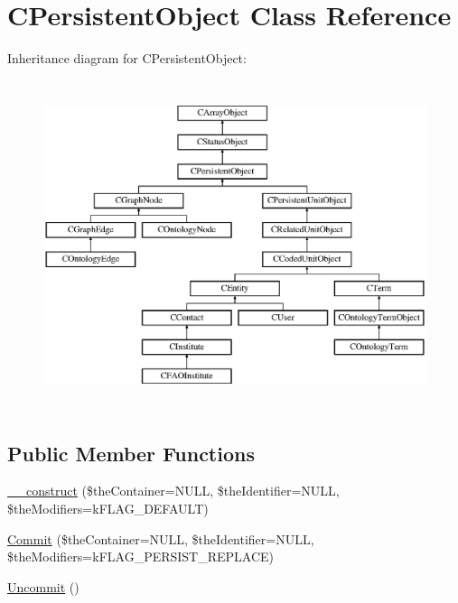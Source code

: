 \hypertarget{class_c_persistent_object}{\section{C\-Persistent\-Object Class Reference}
\label{class_c_persistent_object}
}
Inheritance diagram for C\-Persistent\-Object\-:\begin{figure}[H]
\begin{center}
\leavevmode
\includegraphics[height=9.655172cm]{class_c_persistent_object}
\end{center}
\end{figure}
\subsection*{Public Member Functions}
\begin{DoxyCompactItemize}
\item 
\hyperlink{class_c_persistent_object_a0f0729cfaef48bd1c98c0711c061a7d3}{\-\_\-\-\_\-construct} (\$the\-Container=N\-U\-L\-L, \$the\-Identifier=N\-U\-L\-L, \$the\-Modifiers=k\-F\-L\-A\-G\-\_\-\-D\-E\-F\-A\-U\-L\-T)
\item 
\hyperlink{class_c_persistent_object_a88b1f2b11d3d60e0b3d33d8b0649b68a}{Commit} (\$the\-Container=N\-U\-L\-L, \$the\-Identifier=N\-U\-L\-L, \$the\-Modifiers=k\-F\-L\-A\-G\-\_\-\-P\-E\-R\-S\-I\-S\-T\-\_\-\-R\-E\-P\-L\-A\-C\-E)
\item 
\hyperlink{class_c_persistent_object_a37c897b534e88477a06ec60b89d84450}{Uncommit} ()
\end{DoxyCompactItemize}
